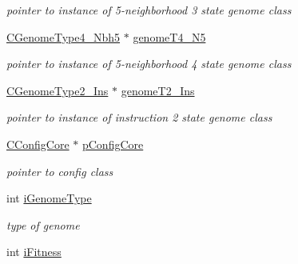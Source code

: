 \begin{DoxyCompactItemize}
\begin{DoxyCompactList}\small\item\em pointer to instance of 5-\/neighborhood 3 state genome class \item\end{DoxyCompactList}\item 
\hypertarget{classCGenome_a0118c83be39b907d145b56fcda473516}{
\hyperlink{classCGenomeType4__Nbh5}{CGenomeType4\_\-Nbh5} $\ast$ \hyperlink{classCGenome_a0118c83be39b907d145b56fcda473516}{genomeT4\_\-N5}}
\label{classCGenome_a0118c83be39b907d145b56fcda473516}

\begin{DoxyCompactList}\small\item\em pointer to instance of 5-\/neighborhood 4 state genome class \item\end{DoxyCompactList}\item 
\hypertarget{classCGenome_a2e1b5934a61dee7931c3e469ce72d54e}{
\hyperlink{classCGenomeType2__Ins}{CGenomeType2\_\-Ins} $\ast$ \hyperlink{classCGenome_a2e1b5934a61dee7931c3e469ce72d54e}{genomeT2\_\-Ins}}
\label{classCGenome_a2e1b5934a61dee7931c3e469ce72d54e}

\begin{DoxyCompactList}\small\item\em pointer to instance of instruction 2 state genome class \item\end{DoxyCompactList}\item 
\hypertarget{classCGenome_afa9cc5e237f14127319f1d4a41152b15}{
\hyperlink{classCConfigCore}{CConfigCore} $\ast$ \hyperlink{classCGenome_afa9cc5e237f14127319f1d4a41152b15}{pConfigCore}}
\label{classCGenome_afa9cc5e237f14127319f1d4a41152b15}

\begin{DoxyCompactList}\small\item\em pointer to config class \item\end{DoxyCompactList}\item 
\hypertarget{classCGenome_a8646329916a00dbadf7939e8b0335150}{
int \hyperlink{classCGenome_a8646329916a00dbadf7939e8b0335150}{iGenomeType}}
\label{classCGenome_a8646329916a00dbadf7939e8b0335150}

\begin{DoxyCompactList}\small\item\em type of genome \item\end{DoxyCompactList}\item 
\hypertarget{classCGenome_a4c91db4e82ee7e08279ef3544531e932}{
int \hyperlink{classCGenome_a4c91db4e82ee7e08279ef3544531e932}{iFitness}}
\label{classCGenome_a4c91db4e82ee7e08279ef3544531e932}


\end{DoxyCompactItemize}
